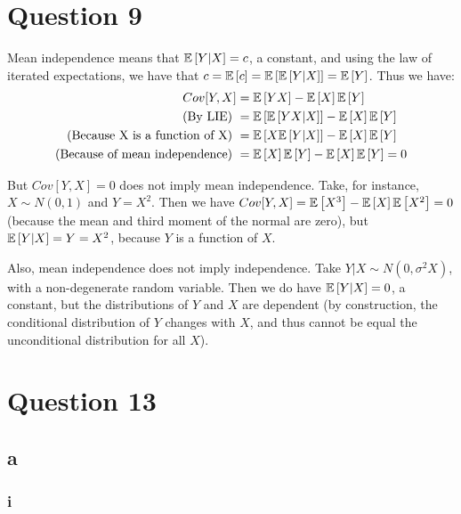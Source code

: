 \documentclass[12pt]{paper}
\begin{document}
\section*{Question 9}

Mean independence means that $\mathbb{E} \left [ Y|X \right ]=c$, a constant, and using the law of iterated expectations, we have that $c=\mathbb{E} \left [ c \right ]=\mathbb{E} \left [ \mathbb{E} \left [ Y|X \right ] \right ]=\mathbb{E} \left [ Y \right ]$. Thus we have:
\begin{equation}
\begin{split}
Cov[Y,X]&=\mathbb{E} \left [ YX \right ]-\mathbb{E} \left [ X \right ]\mathbb{E} \left [ Y \right ]\\
\text{(By LIE)  }&=\mathbb{E} \left [ \mathbb{E} \left [ YX|X \right ] \right ]-\mathbb{E} \left [ X \right ]\mathbb{E} \left [ Y \right ]\\
\text{(Because X is a function of X)  }&=\mathbb{E} \left [ X\mathbb{E} \left [ Y|X \right ] \right ]-\mathbb{E} \left [ X \right ]\mathbb{E} \left [ Y \right ]\\
\text{(Because of mean independence)  }&=\mathbb{E} \left [ X \right ]\mathbb{E} \left [ Y \right ]-\mathbb{E} \left [ X \right ]\mathbb{E} \left [ Y \right ]=0\\
\end{split}
\end{equation}

But $Cov[Y,X]=0$ does not imply mean independence. Take, for instance, $X\sim N(0,1)$ and $Y=X^2$. Then we have $Cov[Y,X]=\mathbb{E} \left [ X^3 \right ]-\mathbb{E} \left [ X \right ]\mathbb{E} \left [ X^2 \right ]=0$ (because the mean and third moment of the normal are zero), but $\mathbb{E} \left [ Y|X \right ]=Y=X^2$, because $Y$ is a function of $X$. 

Also, mean independence does not imply independence. Take $Y|X\sim N(0,\sigma^2 X)$, with a non-degenerate random variable. Then we do have $\mathbb{E} \left [ Y|X \right ]=0$, a constant, but the distributions of $Y$ and $X$ are dependent (by construction, the conditional distribution of $Y$ changes with $X$, and thus cannot be equal the unconditional distribution for all $X$). 

\section*{Question 13}

\subsection*{a}

\subsubsection*{i}
\end{document}
